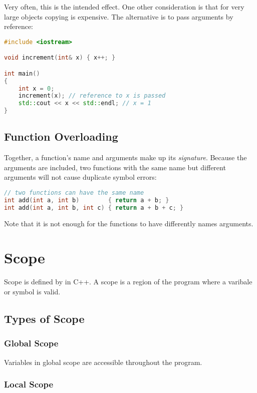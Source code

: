 \documentclass{article}
\begin{document}
\noindent
Very often, this is the intended effect. One other consideration is that for very large objects copying is expensive. The alternative is to pass arguments by reference:

\begin{lstlisting}[language=C++]
#include <iostream>

void increment(int& x) { x++; }

int main()
{
	int x = 0;
	increment(x); // reference to x is passed
	std::cout << x << std::endl; // x = 1
}
\end{lstlisting}

\subsection{Function Overloading}

\noindent
Together, a function's name and arguments make up its \textit{signature}. Because the arguments are included, two functions with the same name but different arguments will not cause duplicate symbol errors:

\begin{lstlisting}[language=C++]
// two functions can have the same name
int add(int a, int b)        { return a + b; }
int add(int a, int b, int c) { return a + b + c; }
\end{lstlisting}

\noindent
Note that it is not enough for the functions to have differently names arguments.

\section{Scope}

\noindent
Scope is defined by \inlinecpp{\{\}} in C++. A scope is a region of the program where a varibale or symbol is valid.

\subsection{Types of Scope}

\subsubsection{Global Scope}

Variables in global scope are accessible throughout the program.

\subsubsection{Local Scope}
\end{document}
